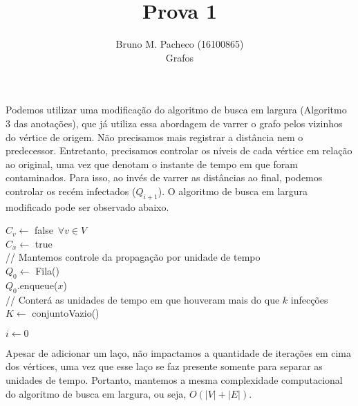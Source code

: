 \documentclass[a4paper]{report}
\begin{document}
 
\title{Prova 1}
\author{Bruno M. Pacheco (16100865)\\
Grafos}
 
\maketitle
 

Podemos utilizar uma modificação do algoritmo de busca em largura (Algoritmo 3 das anotações), que já utiliza essa abordagem de varrer o grafo pelos vizinhos do vértice de origem. Não precisamos mais registrar a distância nem o predecessor. Entretanto, precisamos controlar os níveis de cada vértice em relação ao original, uma vez que denotam o instante de tempo em que foram contaminados. Para isso, ao invés de varrer as distâncias ao final, podemos controlar os recém infectados ($Q_{i+1}$). O algoritmo de busca em largura modificado pode ser observado abaixo.

\begin{algorithm}[H]
    $C_v \gets  $ false $\, \forall v\in V$ \\
    $C_x\gets $ true \\
    // Mantemos controle da propagação por unidade de tempo \\
    $Q_0\gets $ Fila()\\
    $Q_0$.enqueue($x$) \\

    // Conterá as unidades de tempo em que houveram mais do que $k$ infecções \\
    $K \gets $ conjuntoVazio()

    $i \gets 0$


\end{algorithm}

Apesar de adicionar um laço, não impactamos a quantidade de iterações em cima dos vértices, uma vez que esse laço se faz presente somente para separar as unidades de tempo. Portanto, mantemos a mesma complexidade computacional do algoritmo de busca em largura, ou seja, $O\left( \left| V \right| + \left| E \right|   \right) $.
\end{document}
